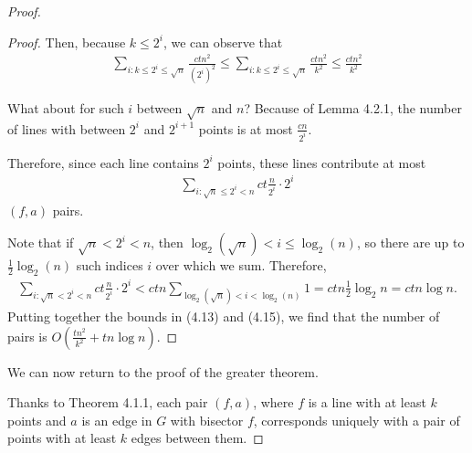 \documentclass{scrippsthesisclass}
\theoremstyle{definition}
\begin{document}
\begin{proof}
\begin{proof}
    Then, because $k \leq 2^i$, we can observe that 
    \begin{align}
        \sum_{i: k \leq 2^i \leq \sqrt{n}} \frac{ctn^2}{(2^i)^2} \leq \sum_{i: k \leq 2^i \leq \sqrt{n}} \frac{ctn^2}{k^2} \leq \frac{ctn^2}{k^2}
    \end{align}
    

    What about for such $i$ between $\sqrt{n}$ and $n$?
   Because of Lemma 4.2.1, the number of lines with between $2^i$ and $2^{i+1}$ points is at most $\frac{cn}{2^i}$.
   
   Therefore, since each line contains $2^i$ points, these lines contribute at most 
   \begin{align}
   \sum_{i: \sqrt{n} \leq 2^i < n} ct\frac{n}{2^i} \cdot 2^i
   \end{align}
   $(f, a)$ pairs.

   Note that if $\sqrt{n} < 2^i < n$, then $\log_2(\sqrt{n}) < i \leq \log_2(n)$, so there are up to $\frac{1}{2} \log_2 (n)$ such indices $i$ over which we sum.
   Therefore, 
   \begin{align}
   \sum_{i: \sqrt{n} < 2^i < n} ct\frac{n}{2^i} \cdot 2^i < ctn \sum_{\log_2(\sqrt{n}) < i < \log_2(n)} 1 = ctn \frac{1}{2}\log_2 n = ctn \log n.
   \end{align}
   Putting together the bounds in (4.13) and (4.15), we find that the number of pairs is $O\left(\frac{tn^2}{k^2} + tn \log n \right)$. 
\end{proof}

We can now return to the proof of the greater theorem.

Thanks to Theorem 4.1.1, each pair $(f, a)$, where $f$ is a line with at least $k$ points and $a$ is an edge in $G$ with bisector $f$, corresponds uniquely with a pair of points with at least $k$ edges between them.


\end{proof}
\end{document}
